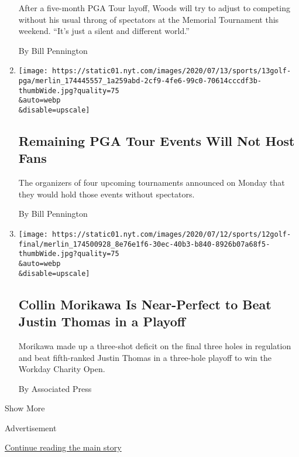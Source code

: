 \begin{enumerate}
  After a five-month PGA Tour layoff, Woods will try to adjust to
  competing without his usual throng of spectators at the Memorial
  Tournament this weekend. ``It's just a silent and different world.''

  By Bill Pennington
\item
  \href{/2020/07/13/sports/golf/pga-tour-schedule-fans.html}{}

  \texttt{[image: https://static01.nyt.com/images/2020/07/13/sports/13golf-pga/merlin\_174445557\_1a259abd-2cf9-4fe6-99c0-70614cccdf3b-thumbWide.jpg?quality=75\\\&auto=webp\\\&disable=upscale]}

  \hypertarget{remaining-pga-tour-events-will-not-host-fans}{%
  \subsection{Remaining PGA Tour Events Will Not Host
  Fans}\label{remaining-pga-tour-events-will-not-host-fans}}

  The organizers of four upcoming tournaments announced on Monday that
  they would hold those events without spectators.

  By Bill Pennington
\item
  \href{/2020/07/12/sports/golf/workday-charity-tv-collin-morikawa-justin-thomas.html}{}

  \texttt{[image: https://static01.nyt.com/images/2020/07/12/sports/12golf-final/merlin\_174500928\_8e76e1f6-30ec-40b3-b840-8926b07a68f5-thumbWide.jpg?quality=75\\\&auto=webp\\\&disable=upscale]}

  \hypertarget{collin-morikawa-is-near-perfect-to-beat-justin-thomas-in-a-playoff}{%
  \subsection{Collin Morikawa Is Near-Perfect to Beat Justin Thomas in a
  Playoff}\label{collin-morikawa-is-near-perfect-to-beat-justin-thomas-in-a-playoff}}

  Morikawa made up a three-shot deficit on the final three holes in
  regulation and beat fifth-ranked Justin Thomas in a three-hole playoff
  to win the Workday Charity Open.

  By Associated Press
\end{enumerate}

Show More

Advertisement

\protect\hyperlink{after-mid1}{Continue reading the main story}

